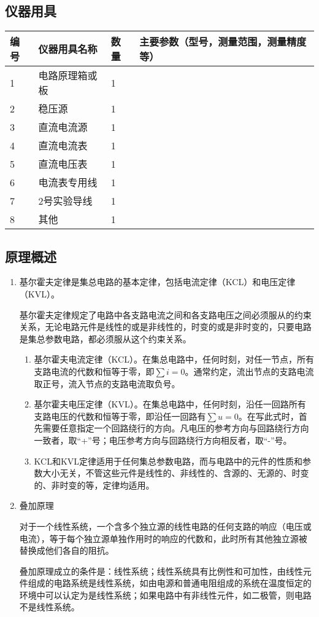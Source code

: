 \documentclass[dvipsnames, svgnames,a4paper,11pt]{article}
\begin{document}
\subsection{仪器用具}
\begin{table}[htbp]
	\centering
	\renewcommand\arraystretch{1.6}
	\begin{tabular}{p{}|p{}|p{}|p{}}
	\hline
	编号& 仪器用具名称 & 数量 &  主要参数（型号，测量范围，测量精度等） \\
	\hline
	1&电路原理箱或板&1 &\\
	\hline
    2&稳压源&1 &\\
	\hline
    3&直流电流源&1 &\\
	\hline
    4&直流电流表&1 &\\
	\hline
    5&直流电压表&1 &\\
	\hline
    6&电流表专用线&1 &\\
	\hline
    7&2号实验导线&1 &\\
	\hline
    8&其他&1 &\\
	\hline
\end{tabular}
\end{table}


\subsection{原理概述}
\begin{enumerate}
    \item 基尔霍夫定律是集总电路的基本定律，包括电流定律（KCL）和电压定律（KVL）。\par
    基尔霍夫定律规定了电路中各支路电流之间和各支路电压之间必须服从的约束关系，无论电路元件是线性的或是非线性的，时变的或是非时变的，只要电路是集总参数电路，都必须服从这个约束关系。
    \begin{enumerate}
        \item 基尔霍夫电流定律（KCL）。在集总电路中，任何时刻，对任一节点，所有支路电流的代数和恒等于零，即$\sum i=0$。通常约定，流出节点的支路电流取正号，流入节点的支路电流取负号。
        \item 基尔霍夫电压定律（KVL）。在集总电路中，任何时刻，沿任一回路所有支路电压的代数和恒等于零，即沿任一回路有$\sum u=0$。在写此式时，首先需要任意指定一个回路绕行的方向。凡电压的参考方向与回路绕行方向一致者，取“+”号；电压参考方向与回路绕行方向相反者，取“-”号。
        \item KCL和KVL定律适用于任何集总参数电路，而与电路中的元件的性质和参数大小无关，不管这些元件是线性的、非线性的、含源的、无源的、时变的、非时变的等，定律均适用。
    \end{enumerate}
    \item 叠加原理\par
    对于一个线性系统，一个含多个独立源的线性电路的任何支路的响应（电压或电流），等于每个独立源单独作用时的响应的代数和，此时所有其他独立源被替换成他们各自的阻抗。\par
    叠加原理成立的条件是：线性系统；线性系统具有比例性和可加性，由线性元件组成的电路系统是线性系统，如由电源和普通电阻组成的系统在温度恒定的环境中可以认定为是线性系统；如果电路中有非线性元件，如二极管，则电路不是线性系统。

\end{enumerate}
\end{document}
